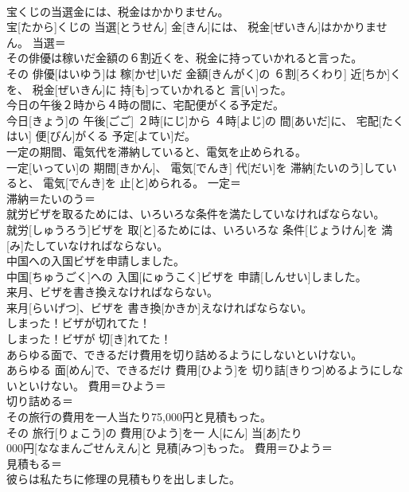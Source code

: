 \documentclass[8pt]{extreport}
\begin{document}
\begin{CJK}{UTF8}{min}
\\	宝くじの当選金には、税金はかかりません。	
\\	宝[たから]くじの 当選[とうせん] 金[きん]には、 税金[ぜいきん]はかかりません。	当選＝ 
\\	その俳優は稼いだ金額の６割近くを、税金に持っていかれると言った。	
\\	その 俳優[はいゆう]は 稼[かせ]いだ 金額[きんがく]の ６割[ろくわり] 近[ちか]くを、 税金[ぜいきん]に 持[も]っていかれると 言[い]った。	
\\	今日の午後２時から４時の間に、宅配便がくる予定だ。	
\\	今日[きょう]の 午後[ごご] ２時[にじ]から ４時[よじ]の 間[あいだ]に、 宅配[たくはい] 便[びん]がくる 予定[よてい]だ。	
\\	一定の期間、電気代を滞納していると、電気を止められる。	
\\	一定[いってい]の 期間[きかん]、 電気[でんき] 代[だい]を 滞納[たいのう]していると、 電気[でんき]を 止[と]められる。	一定＝ 
\\	滞納＝たいのう＝ 
\\	就労ビザを取るためには、いろいろな条件を満たしていなければならない。	
\\	就労[しゅうろう]ビザを 取[と]るためには、いろいろな 条件[じょうけん]を 満[み]たしていなければならない。	
\\	中国への入国ビザを申請しました。	
\\	中国[ちゅうごく]への 入国[にゅうこく]ビザを 申請[しんせい]しました。	
\\	来月、ビザを書き換えなければならない。	
\\	来月[らいげつ]、ビザを 書き換[かきか]えなければならない。	
\\	しまった！ビザが切れてた！	
\\	しまった！ビザが 切[き]れてた！	
\\	あらゆる面で、できるだけ費用を切り詰めるようにしないといけない。	
\\	あらゆる 面[めん]で、できるだけ 費用[ひよう]を 切り詰[きりつ]めるようにしないといけない。	費用＝ひよう＝ 
\\	切り詰める＝ 
\\	その旅行の費用を一人当たり75,000円と見積もった。	
\\	その 旅行[りょこう]の 費用[ひよう]を一 人[にん] 当[あ]たり 
\\	000円[ななまんごせんえん]と 見積[みつ]もった。	費用＝ひよう＝ 
\\	見積もる＝ 
\\	彼らは私たちに修理の見積もりを出しました。	

\end{CJK}
\end{document}
